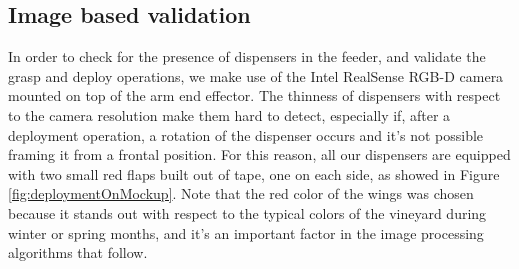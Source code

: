 \subsection{Image based validation}\label{subsec:imageBasedValidationSec}
In order to check for the presence of dispensers in the feeder, and validate the grasp and deploy operations, we make use of the Intel RealSense RGB-D camera mounted on top of the arm end effector. The thinness of dispensers with respect to the camera resolution make them hard to detect, especially if, after a deployment operation, a rotation of the dispenser occurs and it's not possible framing it from a frontal position. For this reason, all our dispensers are equipped with two small red flaps built out of tape, one on each side, as showed in Figure \ref{fig:deploymentOnMockup}. Note that the red color of the wings was chosen because it stands out with respect to the typical colors of the vineyard during winter or spring months, and it's an important factor in the image processing algorithms that follow. 

